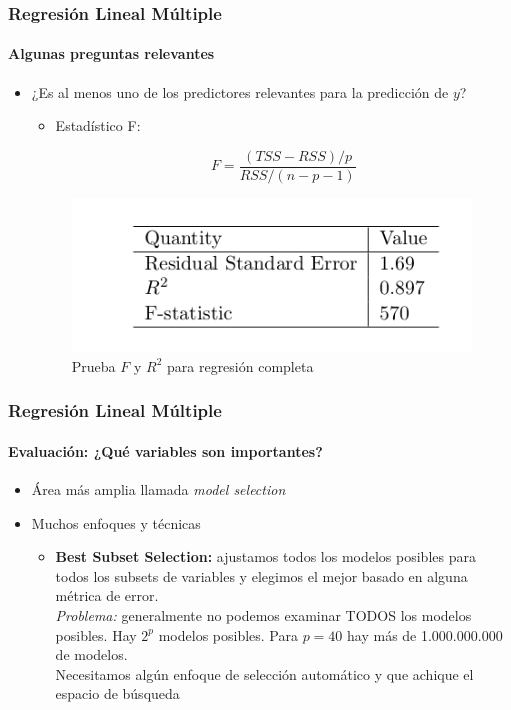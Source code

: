 \documentclass{beamer}
\begin{document}
\begin{frame}
	\frametitle{Regresión Lineal Múltiple}
	\framesubtitle{Algunas preguntas relevantes}
	\begin{itemize}
		\item¿Es al menos uno de los predictores relevantes para la predicción de $y$?
		\begin{itemize}
			\item Estadístico F:
			
			\begin{equation}
				F = \frac{(TSS - RSS) / p}{RSS/(n-p-1)}
			\end{equation}
		
		\end{itemize}

\begin{figure}[h]
	\includegraphics[width=0.5\linewidth, height=0.25\textheight]{./img/table03}
	\caption{Prueba $F$ y $R^2$ para regresión completa \cite{hastie02}}
\end{figure}
		
		
	\end{itemize}
\end{frame}



\begin{frame}
	\frametitle{Regresión Lineal Múltiple}
	\framesubtitle{Evaluación: ¿Qué variables son importantes?}
	\begin{itemize}
		\item{Área más amplia llamada \emph{model selection}}
		\item{Muchos enfoques y técnicas}
		\begin{itemize}
			\item{\textbf{Best Subset Selection:} ajustamos todos los modelos posibles para todos los subsets de variables y elegimos el mejor basado en alguna métrica de error. \\
			\emph{Problema:} generalmente no podemos examinar TODOS los modelos posibles. Hay $2^p$ modelos posibles. Para $p=40$ hay más de 1.000.000.000 de modelos.\\
			Necesitamos algún enfoque de selección automático y que achique el espacio de búsqueda}
		\end{itemize}
	\end{itemize}
\end{frame}
\end{document}
